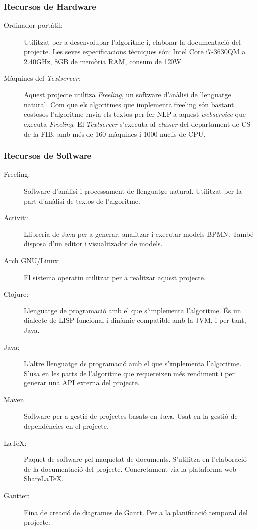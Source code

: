 \documentclass[10pt,a4paper]{article}
\begin{document}
\subsubsection{Recursos de Hardware}

\begin{description}
    \item[Ordinador portàtil:] {Utilitzat per a desenvolupar l'algoritme i, elaborar la documentació del projecte. Les seves especificacions tècniques són: Intel Core i7-3630QM a 2.40GHz, 8GB de memòria RAM, consum de 120W}
    
    \item[Màquines del \emph{Textserver}:]{Aquest projecte utilitza \emph{Freeling}, un software d'anàlisi de llenguatge natural. Com que els algoritmes que implementa freeling són bastant costosos l'algoritme envia els textos per fer NLP a aquest \emph{webservice} que executa \emph{Freeling}. El \emph{Textserver} s'executa al \emph{cluster} del departament de CS de la FIB, amb més de 160 màquines i 1000 nuclis de CPU.}
    
\end{description}

\subsubsection{Recursos de Software}

\begin{description}
    \item[Freeling:]{Software d'anàlisi i processament de llenguatge natural. Utilitzat per la part d'anàlisi de textos de l'algoritme.}
    \item[Activiti:]{Llibreria de Java per a generar, analitzar i executar models BPMN. També disposa d'un editor i visualitzador de models.}
    \item[Arch GNU/Linux:]{El sistema operatiu utilitzat per a realitzar aquest projecte.}
    \item[Clojure:]{Llenguatge de programació amb el que s'implementa l'algoritme. És un dialecte de LISP funcional i dinàmic compatible amb la JVM, i per tant, Java.}
    \item[Java:]{L'altre llenguatge de programació amb el que s'implementa l'algoritme. S'usa en les parts de l'algoritme que requereixen més rendiment i per generar una API externa del projecte.}
    \item[Maven]{Software per a gestió de projectes basats en Java. Usat en la gestió de dependències en el projecte.}
    \item[\LaTeX:]{Paquet de software pel maquetat de documents. S'utilitza en l'elaboració de la documentació del projecte. Concretament via la plataforma web Share\LaTeX.}
    \item[Gantter:]{Eina de creació de diagrames de Gantt. Per a la planificació temporal del projecte.}
\end{description}
\end{document}
